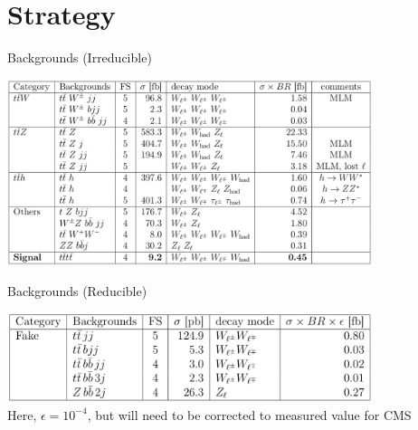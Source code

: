 \documentclass[english,aspectratio=169]{beamer}
\begin{document}
\section{Strategy}
\begin{frame}{Backgrounds (Irreducible)}
  \begin{center}
    \includegraphics[width=0.8\textwidth]{figures/irreducible-backgrounds.png}
  \end{center}
\end{frame}

\begin{frame}{Backgrounds (Reducible)}
  \begin{center}
    \includegraphics[width=0.8\textwidth]{figures/reducible-backgrounds.png}
  \\
  Here, $\epsilon=10^{-4}$, but will need to be corrected to measured value for CMS
  \end{center}
\end{frame}
\end{document}
